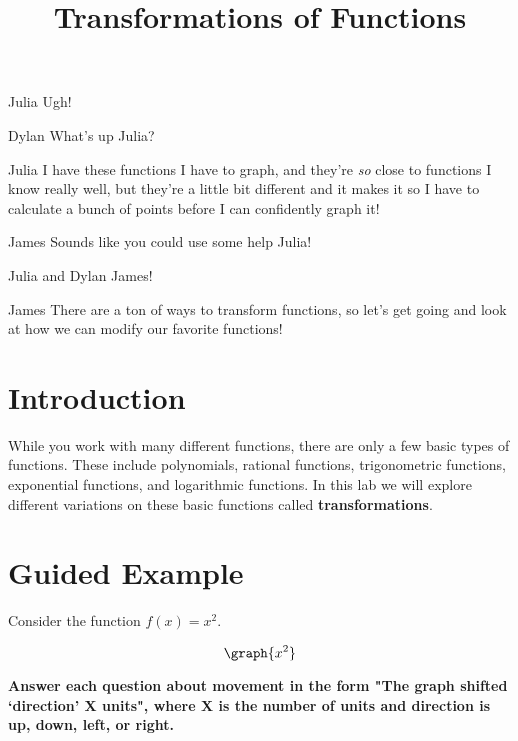 \documentclass{ximera}
\title{Transformations of Functions}
\begin{document}
\maketitle
\begin{dialogue}
\item[Julia] Ugh!
\item[Dylan] What's up Julia?
\item[Julia] I have these functions I have to graph, and they're \textit{so} close to functions I know really well, but they're a little bit different and it makes it so I have to calculate a bunch of points before I can confidently graph it!
\item[James] Sounds like you could use some help Julia!
\item[Julia and Dylan] James!
\item[James] There are a ton of ways to transform functions, so let's get going and look at how we can modify our favorite functions!
\end{dialogue}
\section{Introduction}
While you work with many different functions, there are only a few basic types of functions. These include polynomials, rational functions, trigonometric functions, exponential functions, and logarithmic functions. In this lab we will explore different variations on these basic functions called \textbf{transformations}.
\section{Guided Example}
Consider the function $f(x)=x^2$.

\[
\graph{x^2}
\]

\textbf{Answer each question about movement in the form "The graph shifted `direction' X units", where X is the number of units and direction is up, down, left, or right.}
\end{document}
